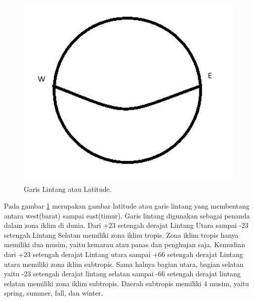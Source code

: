 	\begin{figure}[ht]
	\centerline{\includegraphics[width=1\textwidth]{figures/latitude.PNG}}
	\caption{Garis Lintang atau Latitude.}
	\label{latitude}
	\end{figure}
Pada gambar \ref{latitude} merupakan gambar latitude atau garis lintang yang membentang antara west(barat) sampai east(timur).
Garis lintang digunakan sebagai penanda dalam zona iklim di dunia. Dari +23 setengah derajat Lintang Utara sampai -23 setengah Lintang Selatan memiliki zona iklim tropis. Zona iklim tropis hanya memiliki dua musim, yaitu kemarau atau panas dan penghujan saja. Kemudian dari +23 setengah derajat Lintang utara sampai +66 setengah derajat Lintang utara memiliki zona iklim subtropis. Sama halnya bagian utara, bagian selatan yaitu -23 setengah derajat lintang selatan sampai -66 setengah derajat lintang selatan memiliki zona iklim subtropis. Daerah subtropis memiliki 4 musim, yaitu spring, summer, fall, dan winter. 

